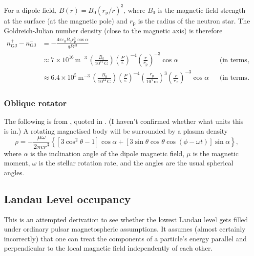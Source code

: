 \documentclass{book}
\newcommand{\rL}{r_\text{lc}} %
\newcommand{\rp}{r_\text{p}} %
\begin{document}
For a dipole field, $B(r) = B_0 (\rp/r)^3$, where $B_0$ is the magnetic field strength at the surface (at the magnetic pole) and $\rp$ is the radius of the neutron star.
The Goldreich-Julian number density (close to the magnetic axis) is therefore
\begin{equation}
    \begin{aligned}
    n_\text{GJ}^+ - n_\text{GJ}^-
        &= -\frac{4\pi\varepsilon_0 B_0 \rp^3 \cos\alpha}{qPr^3} \\
        &\approx 7 \times 10^{16}\,\text{m}^{-3} \, \left(\frac{B_0}{10^{12}\,\text{G}}\right) \left(\frac{P}{\text{s}}\right)^{-4} \left(\frac{r}{\rp}\right)^{-3} \cos\alpha & & \text{(in terms of the stellar radius)}, \\
        &\approx 6.4 \times 10^5\,\text{m}^{-3} \, \left(\frac{B_0}{10^{12}\,\text{G}}\right) \left(\frac{P}{\text{s}}\right)^{-4} \left(\frac{\rp}{10^4\,\text{m}}\right)^3 \left(\frac{r}{\rL}\right)^{-3} \cos\alpha & & \text{(in terms of the light cylinder radius)}.
    \end{aligned}
\end{equation}


\subsubsection{Oblique rotator}

The following is from \citet{Hones1965}, quoted in \citet{Michel2004}.
(I haven't confirmed whether what units this is in.)
A rotating magnetised body will be surrounded by a plasma density
\begin{equation}
    \rho = -\frac{\mu\omega}{2\pi cr^3} \left\{ [ 3 \cos^2\theta - 1 ] \cos\alpha + \left[ 3 \sin\theta \cos\theta \cos(\phi - \omega t) \right] \sin\alpha \right \},
\end{equation}
where $\alpha$ is the inclination angle of the dipole magnetic field, $\mu$ is the magnetic moment, $\omega$ is the stellar rotation rate, and the angles are the usual spherical angles.

\subsection{Landau Level occupancy}

This is an attempted derivation to see whether the lowest Landau level gets filled under ordinary pulsar magnetospheric assumptions.
It assumes (almost certainly incorrectly) that one can treat the components of a particle's energy parallel and perpendicular to the local magnetic field independently of each other.
\end{document}
